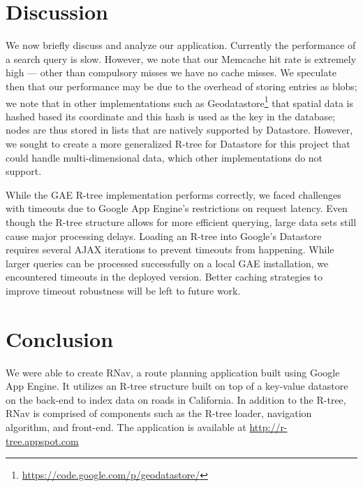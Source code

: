 \documentclass{scrartcl}
\begin{document}
\section{Discussion}
\label{sec:analysis}
We now briefly discuss and analyze our application. Currently the performance of a search query is slow. However, we note that our Memcache hit rate is extremely high --- other than compulsory misses we have no cache misses. We speculate then that our performance may be due to the overhead of storing entries as blobs; we note that in other implementations such as Geodatastore\footnote{\url{https://code.google.com/p/geodatastore/}} that spatial data is hashed based its coordinate and this hash is used as the key in the database; nodes are thus stored in lists that are natively supported by Datastore. However, we sought to create a more generalized R-tree for Datastore for this project that could handle multi-dimensional data, which other implementations do not support.

While the GAE R-tree implementation performs correctly, we faced challenges with timeouts due to Google App Engine's restrictions on request latency. Even though the R-tree structure allows for more efficient querying, large data sets still cause major processing delays. Loading an R-tree into Google's Datastore requires several AJAX iterations to prevent timeouts from happening. While larger queries can be processed successfully on a local GAE installation, we encountered timeouts in the deployed version. Better caching strategies to improve timeout robustness will be left to future work.

\section{Conclusion}
\label{sec:conclusion}
We were able to create RNav, a route planning application built using Google App Engine. It utilizes an R-tree structure built on top of a key-value datastore on the back-end to index data on roads in California. In addition to the R-tree, RNav is comprised of components such as the R-tree loader, navigation algorithm, and front-end. The application is available at \url{http://r-tree.appspot.com}



\end{document}

